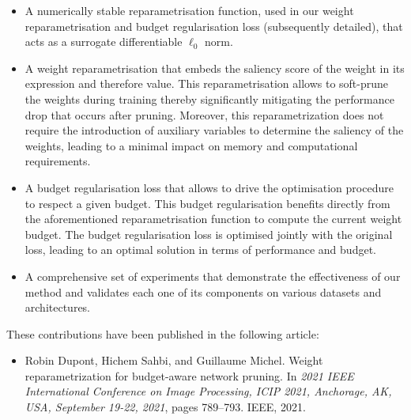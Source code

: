 \begin{itemize}
      \item A numerically stable reparametrisation function, used in our weight
            reparametrisation and budget regularisation loss (subsequently
            detailed), that acts as a surrogate differentiable $\ell_0$ norm.

      \item A weight reparametrisation that embeds the saliency score of the
            weight in its expression and therefore value. This reparametrisation
            allows to soft-prune the weights during training thereby significantly
            mitigating the performance drop that occurs after pruning. Moreover,
            this reparametrization does not require the introduction of auxiliary
            variables to determine the saliency of the weights, leading to a
            minimal impact on memory and computational requirements.

      \item A budget regularisation loss that allows to drive the optimisation
            procedure to respect a given budget. This budget regularisation
            benefits directly from the aforementioned reparametrisation function
            to compute the current weight budget. The budget regularisation loss
            is optimised jointly with the original loss, leading to an optimal
            solution in terms of performance and budget.

      \item A comprehensive set of experiments that demonstrate the effectiveness
            of our method and validates each one of its components on various
            datasets and architectures.\\
\end{itemize}

\noindent These contributions have been published in the following article:
\begin{itemize}
      \item Robin Dupont, Hichem Sahbi, and Guillaume Michel. Weight reparametrization for
            budget-aware network pruning. In \emph{2021 IEEE International Conference on Image
                  Processing, ICIP 2021, Anchorage, AK, USA, September 19-22, 2021}, pages 789–793.
            IEEE, 2021.\\
\end{itemize}



